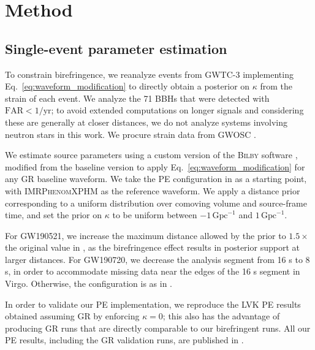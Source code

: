 \documentclass[aps,prd,twocolumn,superscriptaddress,preprintnumbers,nofootinbib]{revtex4-2}
\begin{document}
\section{Method}
\label{sec:Method}

\subsection{Single-event parameter estimation}

To constrain birefringence, we reanalyze events from GWTC-3 \citep{GWTC-2.1, GWTC-3} implementing Eq.~\eqref{eq:waveform_modification} to directly obtain a posterior on $\kappa$ from the strain of each event.
We analyze the 71 \acp{BBH} that were detected with $\mathrm{FAR} < 1/\mathrm{yr}$; to avoid extended computations on longer signals and considering these are generally at closer distances, we do not analyze systems involving neutron stars in this work.
We procure strain data from \ac{GWOSC} \citep{GWOSC}.

We estimate source parameters using a custom version of the \textsc{Bilby} software \citep{Bilby}, modified from the baseline version to apply Eq.~\eqref{eq:waveform_modification} for any \ac{GR} baseline waveform.
We take the \ac{PE} configuration in \citep{GWTC-2.1, GWTC-3, GWTC-2.1_dataset, GWTC-3_dataset} as a starting point, with \textsc{IMRPhenomXPHM} \citep{Pratten:2020ceb} as the reference waveform.
We apply a distance prior corresponding to a uniform distribution over comoving volume and source-frame time, and set the prior on $\kappa$ to be uniform between $-1 \, \mathrm{Gpc}^{-1}$ and $1 \, \mathrm{Gpc}^{-1}$. 

For GW190521, we increase the maximum distance allowed by the prior to $1.5\times$ the original value in \cite{GWTC-2.1_dataset}, as the birefringence effect results in posterior support at larger distances.
For GW190720, we decrease the analysis segment from 16 s to 8 s, in order to accommodate missing data near the edges of the 16 s segment in Virgo.
Otherwise, the configuration is as in \citep{GWTC-2.1, GWTC-3, GWTC-2.1_dataset, GWTC-3_dataset}.

In order to validate our \ac{PE} implementation, we reproduce the \ac{LVK} \ac{PE} results obtained assuming \ac{GR} by enforcing $\kappa = 0$; this also has the advantage of producing \ac{GR} runs that are directly comparable to our birefringent runs.
All our \ac{PE} results, including the \ac{GR} validation runs, are published in \citet{dataset}.
\end{document}
